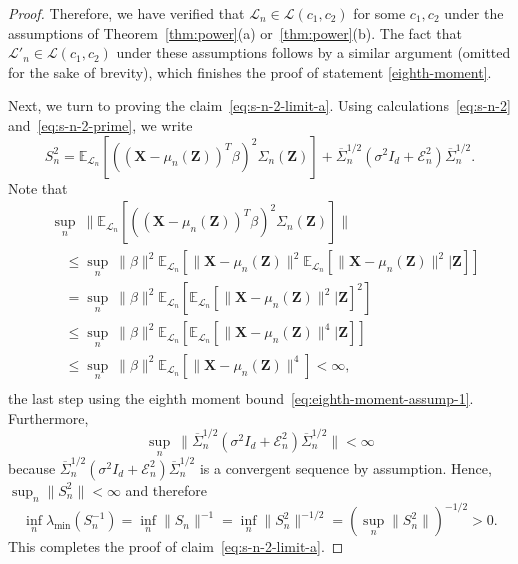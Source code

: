 \documentclass[ejs]{imsart}
\numberwithin{equation}{section}
\theoremstyle{plain}
\theoremstyle{definition}
\theoremstyle{remark}
\newcommand{\prx}{\bm X}
\newcommand{\prz}{\bm Z}
\begin{document}
\begin{proof}
	Therefore, we have verified that $\mathcal L_n \in \mathscr L(c_1, c_2)$ for some $c_1, c_2$ under the assumptions of Theorem~\ref{thm:power}(a) or~\ref{thm:power}(b). The fact that $\mathcal L'_n \in \mathscr L(c_1, c_2)$ under these assumptions follows by a similar argument (omitted for the sake of brevity), which finishes the proof of statement \eqref{eighth-moment}.
	
	Next, we turn to proving the claim~\eqref{eq:s-n-2-limit-a}. Using calculations~\eqref{eq:s-n-2} and~\eqref{eq:s-n-2-prime}, we write
	\begin{equation}
	S_n^2 = \mathbb E_{\mathcal L_n}[((\prx - \mu_n(\prz))^T \beta)^2\Sigma_n(\prz)] + \overline \Sigma_n^{1/2}(\sigma^2 I_d + \mathcal E^2_n) \overline \Sigma_n^{1/2}.
\end{equation}
	Note that 
	\begin{equation}
		\begin{split}
			&\sup_n\ \|\mathbb E_{\mathcal L_n}[((\prx - \mu_n(\prz))^T \beta)^2\Sigma_n(\prz)]\| \\
			&\quad\leq \sup_n\ \|\beta\|^2\mathbb E_{\mathcal L_n}[\|\prx - \mu_n(\prz)\|^2\mathbb E_{\mathcal L_n}[\|\prx - \mu_n(\prz)\|^2|\prz]] \\
			&\quad= \sup_n\ \|\beta\|^2\mathbb E_{\mathcal L_n}[\mathbb E_{\mathcal L_n}[\|\prx - \mu_n(\prz)\|^2|\prz]^2] \\
			&\quad\leq \sup_n\ \|\beta\|^2\mathbb E_{\mathcal L_n}[\mathbb E_{\mathcal L_n}[\|\prx - \mu_n(\prz)\|^4|\prz]] \\
			&\quad\leq \sup_n\ \|\beta\|^2\mathbb E_{\mathcal L_n}[\|\prx - \mu_n(\prz)\|^4] < \infty, \\
			\label{eq:boundedness}
		\end{split}
	\end{equation}
	the last step using the eighth moment bound~\eqref{eq:eighth-moment-assump-1}. Furthermore, 
	\begin{equation}
	\sup_n \ \|\overline \Sigma_n^{1/2}(\sigma^2 I_d + \mathcal E^2_n) \overline \Sigma_n^{1/2}\| < \infty
	\end{equation}
	because $\overline \Sigma_n^{1/2}(\sigma^2 I_d + \mathcal E^2_n) \overline \Sigma_n^{1/2}$ is a convergent sequence by assumption. Hence, $\sup_n \|S_n^2\| < \infty$ and therefore
	\begin{equation*}
	\inf_n \lambda_{\min}(S_n^{-1}) = \inf_n \|S_n\|^{-1} = \inf_n \|S_n^2\|^{-1/2} = \left(\sup_n \|S_n^2\|\right)^{-1/2} > 0.
	\end{equation*}
	This completes the proof of claim~\eqref{eq:s-n-2-limit-a}.	
	

\end{proof}
\end{document}
